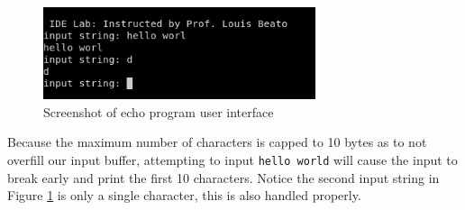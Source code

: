 \documentclass[CMPE]{../KGCOEReport}
\def\code#1{\texttt{#1}}
\begin{document}
    \begin{figure}[h!]
      \centering
      \includegraphics[width=8cm]{part3}
      \caption{Screenshot of echo program user interface}
      \label{fig:part3}
    \end{figure}

	Because the maximum number of characters is capped to 10 bytes as to not overfill our
	input buffer, attempting to input \code{hello world} will cause the input to break
	early and print the first 10 characters. Notice the second input string in Figure
	\ref{fig:part3} is only a single character, this is also handled properly. 

%
\end{document}
